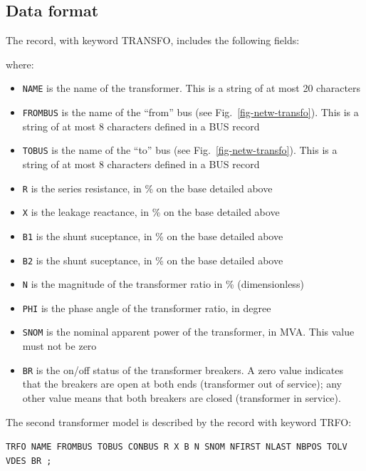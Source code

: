 \subsection{Data format}\label{sec-netw-trfo}

The record, with keyword TRANSFO, includes the following fields:

\hspace*{5ex}{\tt TRANSFO NAME FROMBUS TOBUS R X B1 B2 N PHI SNOM BR ;}

where:
\begin{itemize}
\item {\tt NAME} is the name of the transformer.  This is a string of at most 20 characters
\item {\tt FROMBUS} is the name of the ``from'' bus (see Fig.~\ref{fig-netw-transfo}). This is a string of at most 8 characters defined in a BUS record
\item {\tt TOBUS} is the name of the ``to'' bus (see Fig.~\ref{fig-netw-transfo}). This is a string of at most 8 characters defined in a BUS record
\item{\tt R} is the series resistance, in \% on the base detailed above
\item{\tt X} is the leakage reactance, in \% on the base detailed above
\item{\tt B1} is the shunt suceptance, in \% on the base detailed above
\item{\tt B2} is the shunt suceptance, in \% on the base detailed above
\item{\tt N} is the magnitude of the transformer ratio in \% (dimensionless)
\item{\tt PHI} is the phase angle of the transformer ratio, in degree
\item{\tt SNOM} is the nominal apparent power of the transformer, in MVA. This value must not be zero
\item{\tt BR} is the on/off status of the transformer breakers. A zero value indicates that the breakers are open at both ends (transformer out of service); any other value means that both breakers are closed (transformer in service).
\end{itemize}

The second transformer model is described by the record with keyword TRFO: 

\hspace*{2ex}\mbox{\tt TRFO NAME FROMBUS TOBUS CONBUS R X B N SNOM NFIRST NLAST NBPOS TOLV VDES BR ;}

